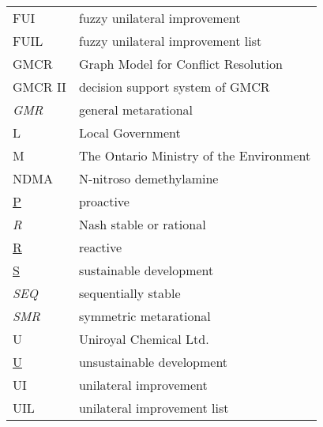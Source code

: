 \begin{longtable}[t]{p{18mm}p{132mm}}
FUI           & fuzzy unilateral improvement \\
FUIL          & fuzzy unilateral improvement list \\
GMCR          & Graph Model for Conflict Resolution \\
GMCR II       & decision support system of GMCR \\
\emph{GMR}    & general metarational \\
L             & Local Government \\
M             & The Ontario Ministry of the Environment \\
NDMA          & N-nitroso demethylamine \\
\underline{P} & proactive \\
\emph{R}      & Nash stable or rational \\
\underline{R} & reactive \\
\underline{S} & sustainable development \\
\emph{SEQ}    & sequentially stable \\
\emph{SMR}    & symmetric metarational \\
U             & Uniroyal Chemical Ltd. \\
\underline{U} & unsustainable development \\
UI            & unilateral improvement \\
UIL           & unilateral improvement list \\
\end{longtable}


\cleardoublepage




